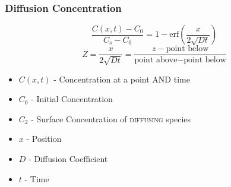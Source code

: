 		\subsubsection{Diffusion Concentration}
			\begin{equation}
				\frac{C \left( x,t \right) - C_{0}}{C_{s}-C_{0}} = 1 - \text{erf} \left( \frac{x}{2 \sqrt{Dt}} \right)
			\end{equation}
			\begin{equation}
				Z = \frac{x}{2 \sqrt{Dt}} = \frac{z-\text{point below}}{\text{point above}-\text{point below}}
			\end{equation}
			\begin{itemize}[noitemsep]
				\item $C \left( x,t \right)$ - Concentration at a point AND time
				\item $C_{0}$  - Initial Concentration
				\item $C_{2}$ - Surface Concentration of \textsc{diffusing} species
				\item $x$ - Position
				\item $D$ - Diffusion Coefficient
				\item $t$ - Time
			\end{itemize}